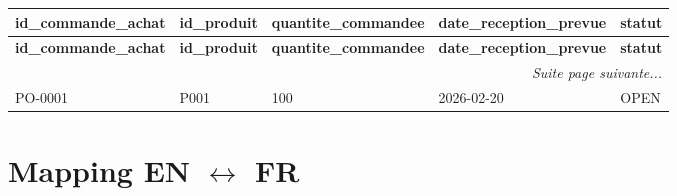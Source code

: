 \documentclass[a4paper,11pt]{article}
\begin{document}
\scriptsize
\begin{longtable}{|l|l|l|l|l|}
\hline
\rowcolor{headerblue}
\textbf{id\_commande\_achat} & \textbf{id\_produit} & \textbf{quantite\_commandee} & \textbf{date\_reception\_prevue} & \textbf{statut} \\ \hline
\endfirsthead
\hline
\rowcolor{headerblue}
\textbf{id\_commande\_achat} & \textbf{id\_produit} & \textbf{quantite\_commandee} & \textbf{date\_reception\_prevue} & \textbf{statut} \\ \hline
\endhead
\hline \multicolumn{5}{|r|}{\textit{Suite page suivante...}} \\ \hline
\endfoot
\hline
\endlastfoot
 PO-0001 & P001 & 100 & 2026-02-20 & OPEN \\ \hline
\end{longtable}
\normalsize

\newpage

\section{Mapping EN $\leftrightarrow$ FR}
\end{document}
